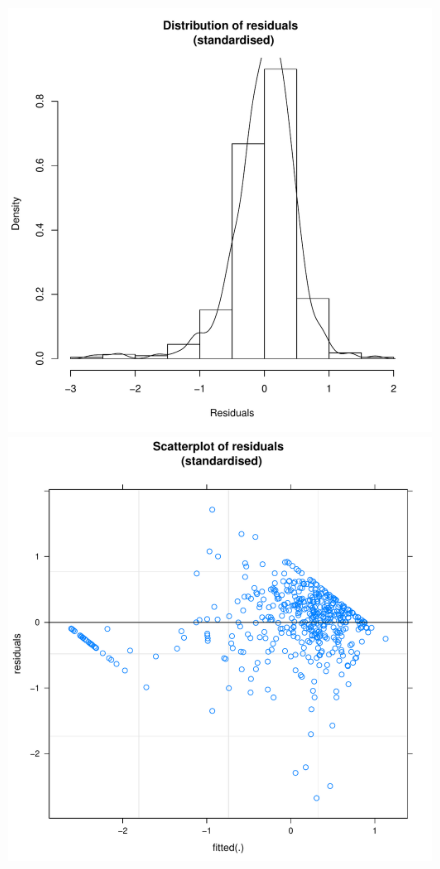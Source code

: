 \begin{CJK}{UTF8}{gbsn}



            \begin{figure}[htbp]
              \includegraphics[scale =.4]{images/MLM31bHist.pdf}
              \includegraphics[scale =.4]{images/MLM31bScatter.pdf}

\end{figure}
\end{CJK}
